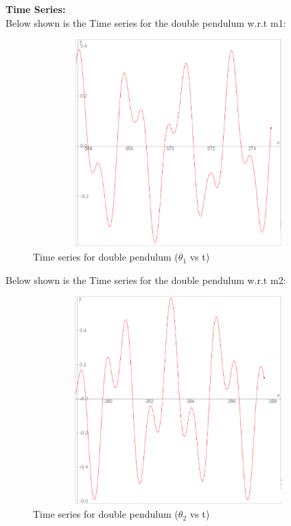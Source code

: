\documentclass[11pt]{scrartcl} %
\begin{document}
\newpage
\textbf{Time Series:}\\
Below shown is the Time series for the double pendulum w.r.t m1:
\begin{figure}[h] %
	\centering
	\includegraphics[width=12cm, height=8cm]{4b_time(1).PNG} %
	\caption{Time series for double pendulum ($\theta_{1}$ vs t)}
\end{figure}

Below shown is the Time series for the double pendulum w.r.t m2:
\begin{figure}[h] %
	\centering
	\includegraphics[width=12cm, height=8cm]{4b_time(2).PNG} %
	\caption{Time series for double pendulum ($\theta_{2}$ vs t)}
\end{figure}
\end{document}
